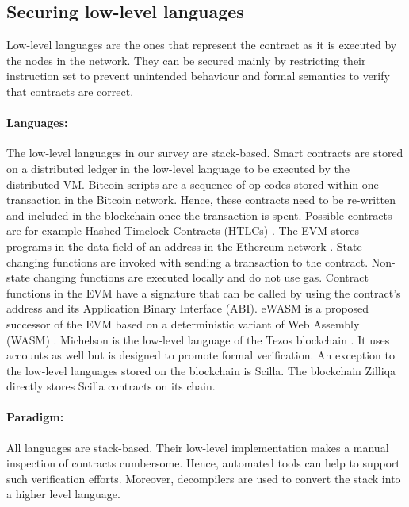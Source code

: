 \subsection{Securing low-level languages}
Low-level languages are the ones that represent the contract as it is executed by the nodes in the network.
They can be secured mainly by restricting their instruction set to prevent unintended behaviour and formal semantics to verify that contracts are correct.

\paragraph{Languages:}
The low-level languages in our survey are stack-based. Smart contracts are stored on a distributed ledger in the low-level language to be executed by the distributed VM.
Bitcoin scripts are a sequence of op-codes stored within one transaction in the Bitcoin network\cite{BitcoinWiki2018Script}. Hence, these contracts need to be re-written and included in the blockchain once the transaction is spent. Possible contracts are for example Hashed Timelock Contracts (HTLCs) \cite{BitcoinWiki2018HTLC}.
The EVM stores programs in the data field of an address in the Ethereum network \cite{Wood2014}. State changing functions are invoked with sending a transaction to the contract. Non-state changing functions are executed locally and do not use gas. Contract functions in the EVM have a signature that can be called by using the contract's address and its Application Binary Interface (ABI).
eWASM is a proposed successor of the EVM based on a deterministic variant of Web Assembly (WASM) \cite{Wanderer2015,EthereumFoundation2018ewasm}.
Michelson is the low-level language of the Tezos blockchain \cite{DynamicLedgerSolutions2017}. It uses accounts as well but is designed to promote formal verification.
An exception to the low-level languages stored on the blockchain is Scilla. The blockchain Zilliqa directly stores Scilla contracts on its chain.

\paragraph{Paradigm:} All languages are stack-based. Their low-level implementation makes a manual inspection of contracts cumbersome. Hence, automated tools can help to support such verification efforts. Moreover, decompilers are used to convert the stack into a higher level language.

